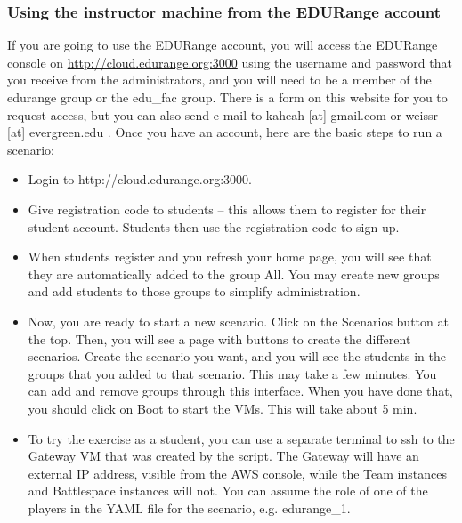 \documentclass[11pt]{report}
\newcommand{\eat}[1]{}
\begin{document}
\subsubsection*{Using the instructor machine from the EDURange account}
If you are going to use the EDURange account, you will access the EDURange console
on \url{http://cloud.edurange.org:3000}
using the username and password that you receive from the administrators, 
and you will need to be a member of the edurange group or the edu\_fac group. 
There is a form on this website for you to request access, but you can also 
send e-mail to kaheah [at] gmail.com or weissr [at] evergreen.edu .  Once you have an account,
here are the basic steps to run a scenario:
\begin{itemize}
  \item Login to http://cloud.edurange.org:3000.  %
  \item Give registration code to students -- this allows them to register for their student account.
    Students then use the registration code to sign up.
  \item When students register and you refresh your home page, you will see that they are automatically 
    added to the group All.  You may create new groups and add students to those groups to simplify 
    administration.
  \item Now, you are ready to start a new scenario.  Click on the Scenarios button at the top.
    Then, you will see a page with buttons to create the different scenarios.
    Create the scenario you want, and you will see
    the students in the groups that you added to that scenario. This may take a few minutes.
    You can add and remove groups through this interface.
    When you have done that, you should click on Boot to start the VMs.  This will take about 5 min.
  \item To try the exercise as a student, you can use a separate terminal to ssh to the Gateway VM
    that was created by the script.  The Gateway will have an external IP address, visible
    from the AWS console, while the Team %
    instances and Battlespace instances will not.
    You can assume the role of one of the players in the YAML file for the scenario, e.g.
    edurange\_1.  

\end{itemize}




  \eat{Describe the role of VPCs and VPNs in AWS.  What are the limits.
we need a video of this.
  At the upper right, there will be a dropdown tab
for the different AWS centers.  You want {\em  East (N Virginia)} and you should see a 
heading called {\bf Resources}.
Under that, click on the link to {\bf Running Instances}. You should see a list of instances.  You will
create your own instance of an instructor machine by taking a snapshot of an existing instructor instance,
 e.g. locasto-instructor.  }
\end{document}

